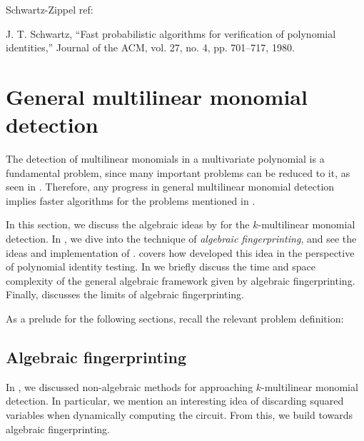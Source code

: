Schwartz-Zippel ref:

J. T. Schwartz, “Fast probabilistic algorithms for verification of
polynomial identities,” Journal of the ACM, vol. 27, no. 4, pp. 701–717,
1980.



\clearpage
\section{General multilinear monomial detection}
\label{sect:general_mld}

The detection of multilinear monomials in a multivariate polynomial is a fundamental problem, 
since many important problems can be reduced to it, 
as seen in . 
Therefore, any progress in general multilinear monomial detection implies 
faster algorithms for the problems mentioned in .

In this section, 
we discuss the algebraic ideas by \citeauthor{KouWil09} \cite{Koutis08, Williams09, KouWil09} 
for the $k$-multilinear monomial detection. 
In , 
we dive into the technique of \emph{algebraic fingerprinting}, and 
see the ideas and implementation of \textcite{Koutis08}. 
 covers how 
\textcite{Williams09} developed this idea  
in the perspective of polynomial identity testing. 
In  we briefly discuss the time and space complexity 
of the general algebraic framework given by algebraic fingerprinting. 
Finally,  discusses the limits of algebraic fingerprinting.

As a prelude for the following sections, recall the relevant problem definition: 
\begin{problem}
\end{problem}

\subsection{Algebraic fingerprinting}
\label{sect:algebraic_fingerprinting}

In , we discussed non-algebraic methods 
for approaching $k$-multilinear monomial detection. In particular, we mention
an interesting idea of discarding squared variables when dynamically 
computing the circuit. From this, we build towards algebraic fingerprinting. 

